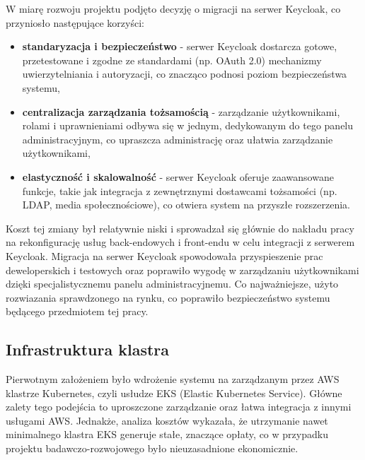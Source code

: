 W miarę rozwoju projektu podjęto decyzję o migracji na serwer Keycloak, co przyniosło następujące korzyści:
\begin{itemize}
    \item \textbf{standaryzacja i bezpieczeństwo} - serwer Keycloak dostarcza gotowe, przetestowane i zgodne ze standardami (np. OAuth 2.0) mechanizmy uwierzytelniania i autoryzacji, co znacząco podnosi poziom bezpieczeństwa systemu,
    \item \textbf{centralizacja zarządzania tożsamością} - zarządzanie użytkownikami, rolami i uprawnieniami odbywa się w jednym, dedykowanym do tego panelu administracyjnym, co upraszcza administrację oraz ułatwia zarządzanie użytkownikami,
    \item \textbf{elastyczność i skalowalność} - serwer Keycloak oferuje zaawansowane funkcje, takie jak integracja z zewnętrznymi dostawcami tożsamości (np. LDAP, media społecznościowe), co otwiera system na przyszłe rozszerzenia.
\end{itemize}


Koszt tej zmiany był relatywnie niski i sprowadzał się głównie do nakładu pracy na rekonfigurację usług back-endowych i front-endu w celu integracji z serwerem Keycloak. Migracja na serwer Keycloak spowodowała przyspieszenie prac deweloperskich i testowych oraz poprawiło wygodę w zarządzaniu użytkownikami dzięki specjalistycznemu panelu administracyjnemu. Co najważniejsze, użyto rozwiazania sprawdzonego na rynku, co poprawiło bezpieczeństwo systemu będącego przedmiotem tej pracy.

\subsection{Infrastruktura klastra}

Pierwotnym założeniem było wdrożenie systemu na zarządzanym przez AWS klastrze Kubernetes, czyli usłudze EKS (Elastic Kubernetes Service). Główne zalety tego podejścia to uproszczone zarządzanie oraz łatwa integracja z innymi usługami AWS. Jednakże, analiza kosztów wykazała, że utrzymanie nawet minimalnego klastra EKS generuje stałe, znaczące opłaty, co w przypadku projektu badawczo-rozwojowego było nieuzasadnione ekonomicznie.

